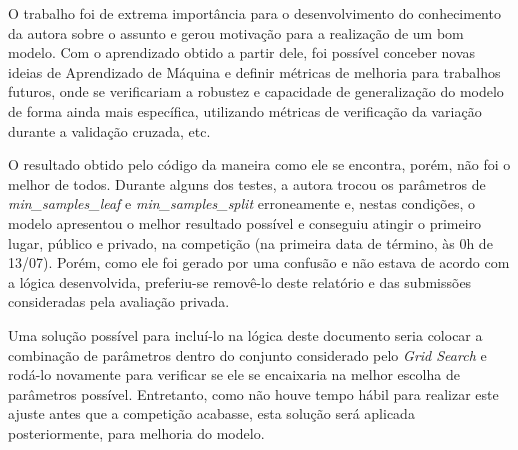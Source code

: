 \documentclass[11pt]{article}
\begin{document}
    O trabalho foi de extrema importância para o desenvolvimento do
conhecimento da autora sobre o assunto e gerou motivação para a
realização de um bom modelo. Com o aprendizado obtido a partir dele, foi
possível conceber novas ideias de Aprendizado de Máquina e definir
métricas de melhoria para trabalhos futuros, onde se verificariam a
robustez e capacidade de generalização do modelo de forma ainda mais
específica, utilizando métricas de verificação da variação durante a
validação cruzada, etc.

O resultado obtido pelo código da maneira como ele se encontra, porém,
não foi o melhor de todos. Durante alguns dos testes, a autora trocou os
parâmetros de \emph{min\_samples\_leaf} e \emph{min\_samples\_split}
erroneamente e, nestas condições, o modelo apresentou o melhor resultado
possível e conseguiu atingir o primeiro lugar, público e privado, na
competição (na primeira data de término, às 0h de 13/07). Porém, como
ele foi gerado por uma confusão e não estava de acordo com a lógica
desenvolvida, preferiu-se removê-lo deste relatório e das submissões
consideradas pela avaliação privada.

Uma solução possível para incluí-lo na lógica deste documento seria
colocar a combinação de parâmetros dentro do conjunto considerado pelo
\emph{Grid Search} e rodá-lo novamente para verificar se ele se
encaixaria na melhor escolha de parâmetros possível. Entretanto, como
não houve tempo hábil para realizar este ajuste antes que a competição
acabasse, esta solução será aplicada posteriormente, para melhoria do
modelo.


    
    
    
    
\end{document}
